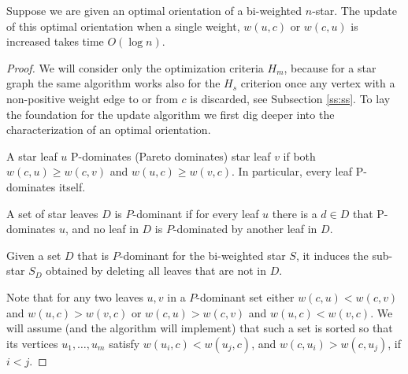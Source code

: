 \begin{theorem}
	Suppose we are given an optimal orientation of a bi-weighted $n$-star.
	The update of this optimal orientation when a single weight, $w(u,c)$ or $w(c,u)$
	is increased takes time $O(\log n)$.
\end{theorem}
\begin{proof}	
	We will consider only the optimization criteria $H_m$, because for a star graph
	the same algorithm works also for the $H_s$ criterion once any vertex with a 
	non-positive weight edge to or from $c$ is discarded,
	see Subsection \ref{ss:ss}. 
To lay the foundation for the update algorithm we first dig deeper into the 
characterization
of an optimal orientation. 
\begin{definition}
	A star leaf $u$ P-dominates (Pareto dominates) star leaf $v$ if both $w(c, u) \geq w(c, v)$ and $w(u, c) \geq w(v, c)$. In particular, every leaf P-dominates itself. 
	
	A set of star leaves $D$ is $P$-dominant if for 
	every leaf $u$ there is a $d\in D$ that P-dominates $u$, and no leaf in $D$
	is $P$-dominated by another leaf in $D$. 
	
	Given a set $D$ that is $P$-dominant for the bi-weighted star $S$, it induces
	the sub-star $S_D$ obtained by deleting all leaves that are not in $D$.
\end{definition}
Note that for any two leaves $u,v$ in a $P$-dominant set either 
$w(c,u)<w(c,v)$ and $w(u,c)>w(v,c)$ or $w(c,u)>w(c,v)$ and $w(u,c)<w(v,c)$.
We will assume (and the algorithm will implement) that such a set is sorted so
that its vertices $u_1,\ldots,u_m$ satisfy $w( u_i,c)<w(u_j,c)$, and $w(c,u_i)>w(c,u_j)$, 
if $i<j$.


\end{proof}
